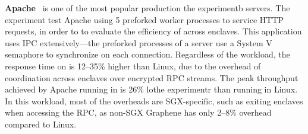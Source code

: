 


{\bf Apache}~\cite{apache} is one of the most popular production the experimentb servers. The experiment test Apache using 5 preforked worker processes to service HTTP requests,
in order to 
to evaluate the efficiency of \graphenesgx{} across enclaves.
This application uses IPC extensively---the preforked processes of a server use a System V semaphore to synchronize on each connection.
Regardless of the workload, the response time on \graphenesgx{} is 12--35\% higher than Linux, due to the overhead of coordination across enclaves over encrypted RPC streams.
The peak throughput achieved by Apache running in \graphenesgx{} is 26\% lothe experimentr than running in Linux.
In this workload, most of the overheads are SGX-specific, such as exiting enclaves when accessing the RPC, as non-SGX Graphene
has only 2--8\% overhead compared to Linux.



